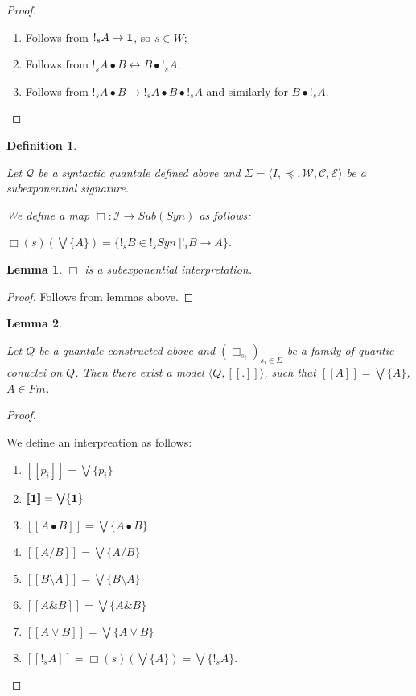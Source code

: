 \documentclass[a4paper]{article}
\theoremstyle{defin}
\newtheorem{defin}{Definition}
\theoremstyle{theorem}
\theoremstyle{prop}
\theoremstyle{lemma}
\newtheorem{lemma}{Lemma}
\theoremstyle{ex}
\theoremstyle{col}
\begin{document}
\begin{proof}
$ $

\begin{enumerate}
  \item Follows from $!_s A \rightarrow {\bf 1}$, so $s \in W$;
  \item Follows from $!_s A \bullet B \leftrightarrow B \bullet !_s A$;
  \item Follows from $!_s A \bullet B \rightarrow !_s A \bullet B \bullet !_s A$ and similarly for $B \bullet !_s A$.
\end{enumerate}
\end{proof}

\begin{defin}
$ $

Let $\mathcal{Q}$ be a syntactic quantale defined above and $\Sigma = \langle I, \preceq,
\mathcal{W}, \mathcal{C}, \mathcal{E} \rangle$ be a subexponential signature.

We define a map $\Box : \mathcal{I} \to Sub(Syn)$ as follows:

$\Box(s)(\bigvee \{ A \} ) = \{ !_s B \in !_s Syn \: | !_i B \rightarrow A \}$.
\end{defin}

\begin{lemma} $\Box$ is a subexponential interpretation.
\end{lemma}

\begin{proof}
  Follows from lemmas above.
\end{proof}

\begin{lemma}
$ $

  Let $Q$ be a quantale constructed above and $(\Box_{s_i})_{s_i \in \Sigma}$ be a family of quantic conuclei on $Q$.
  Then there exist a model $\langle Q, [\![.]\!]\rangle$, such that $[\![A]\!] = \bigvee \{ A \}$, $A \in Fm$.
\end{lemma}

\begin{proof}
$ $

  We define an interpreation as follows:

\begin{enumerate}
  \item $[\![p_i]\!] = \bigvee \{ p_i \}$
  \item $[\![{\bf 1}]\!] = \bigvee \{ {\bf 1} \}$
  \item $[\![A \bullet B]\!] = \bigvee \{ A \bullet B \}$
  \item $[\![A / B]\!] = \bigvee \{ A / B \}$
  \item $[\![B \setminus A]\!] = \bigvee \{ B \setminus A \}$
  \item $[\![A \& B ]\!] = \bigvee \{ A \& B \}$
  \item $[\![A \lor B]\!] = \bigvee \{ A \lor B\}$
  \item $[\![!_s A]\!] = \Box(s) (\bigvee \{ A \}) = \bigvee \{ !_s A \}$.
\end{enumerate}
\end{proof}
\end{document}
